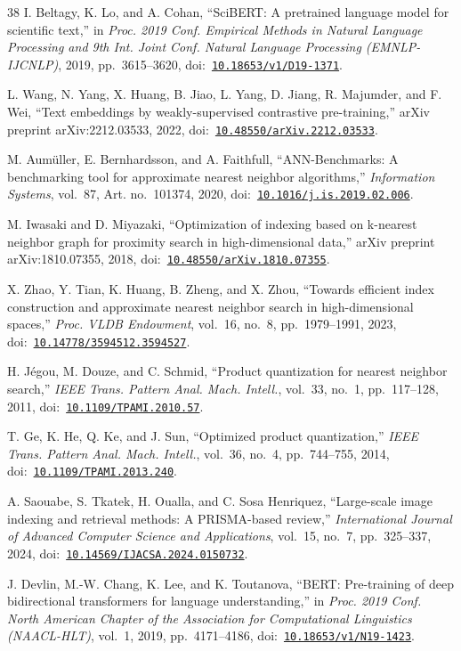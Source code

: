 \documentclass[conference, letterpaper]{IEEEtran}
\newcommand{\doi}[1]{doi:~\href{https://doi.org/#1}{\nolinkurl{#1}}}
\newcommand{\ijacsa}{\textit{International Journal of Advanced Computer Science and Applications}}
\begin{document}
\begin{thebibliography}{38}
I. Beltagy, K. Lo, and A. Cohan, ``SciBERT: A pretrained language model for scientific text,'' in \textit{Proc. 2019 Conf. Empirical Methods in Natural Language Processing and 9th Int. Joint Conf. Natural Language Processing (EMNLP-IJCNLP)}, 2019, pp.~3615--3620, \doi{10.18653/v1/D19-1371}.

L. Wang, N. Yang, X. Huang, B. Jiao, L. Yang, D. Jiang, R. Majumder, and F. Wei, ``Text embeddings by weakly-supervised contrastive pre-training,'' arXiv preprint arXiv:2212.03533, 2022, \doi{10.48550/arXiv.2212.03533}.

M. Aum\"uller, E. Bernhardsson, and A. Faithfull, ``ANN-Benchmarks: A benchmarking tool for approximate nearest neighbor algorithms,'' \textit{Information Systems}, vol.~87, Art. no.~101374, 2020, \doi{10.1016/j.is.2019.02.006}.

M. Iwasaki and D. Miyazaki, ``Optimization of indexing based on k-nearest neighbor graph for proximity search in high-dimensional data,'' arXiv preprint arXiv:1810.07355, 2018, \doi{10.48550/arXiv.1810.07355}.

X. Zhao, Y. Tian, K. Huang, B. Zheng, and X. Zhou, ``Towards efficient index construction and approximate nearest neighbor search in high-dimensional spaces,'' \textit{Proc. VLDB Endowment}, vol.~16, no.~8, pp.~1979--1991, 2023, \doi{10.14778/3594512.3594527}.

H. J\'egou, M. Douze, and C. Schmid, ``Product quantization for nearest neighbor search,'' \textit{IEEE Trans. Pattern Anal. Mach. Intell.}, vol.~33, no.~1, pp.~117--128, 2011, \doi{10.1109/TPAMI.2010.57}.

T. Ge, K. He, Q. Ke, and J. Sun, ``Optimized product quantization,'' \textit{IEEE Trans. Pattern Anal. Mach. Intell.}, vol.~36, no.~4, pp.~744--755, 2014, \doi{10.1109/TPAMI.2013.240}.

A. Saouabe, S. Tkatek, H. Oualla, and C. Sosa Henriquez, ``Large-scale image indexing and retrieval methods: A PRISMA-based review,'' \ijacsa, vol.~15, no.~7, pp.~325--337, 2024, \doi{10.14569/IJACSA.2024.0150732}.

J. Devlin, M.-W. Chang, K. Lee, and K. Toutanova, ``BERT: Pre-training of deep bidirectional transformers for language understanding,'' in \textit{Proc. 2019 Conf. North American Chapter of the Association for Computational Linguistics (NAACL-HLT)}, vol.~1, 2019, pp.~4171--4186, \doi{10.18653/v1/N19-1423}.


\end{thebibliography}
\end{document}
